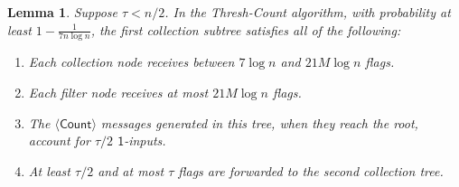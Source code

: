 \documentclass[11pt,letter]{article}
\newcommand{\alg}[1]{\mbox{\textsf{#1}}}
\theoremstyle{mytheoremstyle}
\newtheorem{lemma}{Lemma}
\newcommand{\countm}{$\langle\mathsf{Count}\rangle$\xspace}
\newcommand{\oneinputs}{$\mathsf{1}$-inputs\xspace}
\begin{document}
\begin{lemma}\label{lem:smalltau}
	Suppose $\tau < n/2$.
	In the \alg{Thresh-Count} algorithm, with probability at least $1- \frac{1}{7n\log{n}}$, the first collection subtree satisfies all of the following:
	\begin{enumerate}
		\item Each collection node receives between $7\log{n}$  and
		$21M\log{n}$ flags.
		\item Each filter node receives at most $21M\log{n}$ flags.
		\item The \countm messages generated in this tree, when they reach
		the root, account for $\tau/2$ \oneinputs.
		\item At least $\tau/2$ and at most $\tau$ flags are forwarded to the
		second collection tree.
	\end{enumerate}
\end{lemma}
\end{document}
